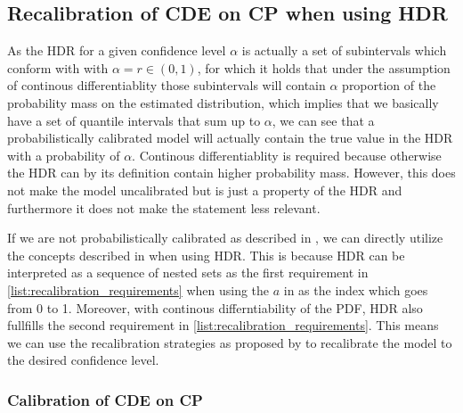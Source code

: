 \subsection{Recalibration of CDE on CP when using HDR}

As the HDR for a given confidence level $\alpha$ is actually a set of subintervals which conform with  with $\alpha = r \in (0,1)$, for which it holds that under the assumption of continous differentiablity those subintervals will contain $\alpha$ proportion of the probability mass on the estimated distribution, which implies that we basically have a set of quantile intervals that sum up to $\alpha$, we can see that a probabilistically calibrated model will actually contain the true value in the HDR with a probability of $\alpha$. Continous differentiablity is required because otherwise the HDR can by its definition contain higher probability mass. However, this does not make the model uncalibrated but is just a property of the HDR and furthermore it does not make the statement less relevant.

If we are not probabilistically calibrated as described in , we can directly utilize the concepts described in  when using HDR. This is because HDR can be interpreted as a sequence of nested sets as the first requirement in \ref{list:recalibration_requirements} when using the $a$ in  as the index which goes from 0 to 1. Moreover, with continous differntiability of the PDF, HDR also fullfills the second requirement in \ref{list:recalibration_requirements}. This means we can use the recalibration strategies as proposed by \cite{sesia2021conformal} to recalibrate the model to the desired confidence level.

\subsubsection{Calibration of CDE on CP}\label{sec:calibration_cde_cp} %

